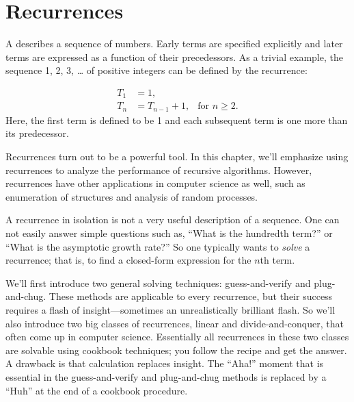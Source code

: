 \chapter{Recurrences}\label{chap:recurrences}


A  describes a sequence of numbers.  Early terms are
specified explicitly and later terms are expressed as a function of
their precedessors.  As a trivial example, the sequence 1, 2, 3, \dots
of positive integers can be defined by the recurrence:


\begin{align*}
T_1 & = 1, \\
T_n & = T_{n-1} + 1, & \text{for $n \geq 2$}.
\end{align*}
Here, the first term is defined to be 1 and each subsequent term is
one more than its predecessor.

Recurrences turn out to be a powerful tool.  In this chapter, we'll
emphasize using recurrences to analyze the performance of recursive
algorithms.  However, recurrences have other applications in computer
science as well, such as enumeration of structures and analysis of
random processes.

A recurrence in isolation is not a very useful description of a
sequence.  One can not easily answer simple questions such as, ``What
is the hundredth term?'' or ``What is the asymptotic growth rate?''
So one typically wants to \emph{solve} a recurrence; that is, to find a
closed-form expression for the $n$th term.

We'll first introduce two general solving techniques: guess-and-verify
and plug-and-chug.  These methods are applicable to every recurrence,
but their success requires a flash of insight---sometimes an
unrealistically brilliant flash.  So we'll also introduce two big
classes of recurrences, linear and divide-and-conquer, that often come
up in computer science.  Essentially all recurrences in these two
classes are solvable using cookbook techniques; you follow the recipe
and get the answer.  A drawback is that calculation replaces insight.
The ``Aha!''  moment that is essential in the guess-and-verify and
plug-and-chug methods is replaced by a ``Huh'' at the end of a
cookbook procedure.

